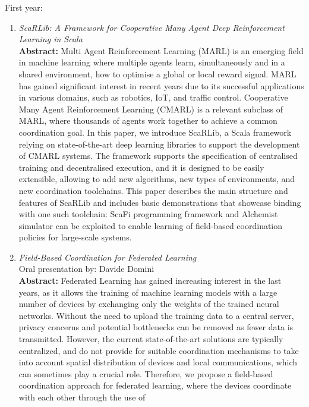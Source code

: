 \documentclass[runningheads]{llncs}
\begin{document}
\noindent
First year:
\begin{enumerate}
    \item \emph{ScaRLib: A Framework for Cooperative Many Agent Deep Reinforcement Learning in Scala}~\cite{DBLP:conf/coordination/DominiCAV23} \\
    \textbf{Abstract: }
    Multi Agent Reinforcement Learning (MARL) is an emerging field in machine learning where multiple agents learn, simultaneously and in a shared environment, 
     how to optimise a global or local reward signal. MARL has gained significant interest in recent years due to its successful applications in various domains,
     such as robotics, IoT, and traffic control. Cooperative Many Agent Reinforcement Learning (CMARL) is a relevant subclass of MARL, where thousands of 
     agents work together to achieve a common coordination goal.
    In this paper, we introduce ScaRLib, a Scala framework relying on state-of-the-art deep learning libraries to support the development of CMARL systems. 
    The framework supports the specification of centralised training and decentralised execution, and it is designed to be easily extensible, allowing to add new 
     algorithms, new types of environments, and new coordination toolchains.
    This paper describes the main structure and features of ScaRLib and includes basic demonstrations that showcase binding with one such toolchain: 
     ScaFi programming framework and Alchemist simulator can be exploited to enable learning of field-based coordination policies for large-scale systems.
    \item \emph{Field-Based Coordination for Federated Learning}~\cite{DBLP:conf/coordination/DominiAEV24} \\ Oral presentation by: Davide Domini \\
    \textbf{Abstract: }
    Federated Learning has gained increasing interest in the last years, as it allows the training of machine learning models with a large number of devices 
     by exchanging only the weights of the trained neural networks. 
    Without the need to upload the training data to a central server, privacy concerns and potential bottlenecks can be removed as fewer data is transmitted. 
    However, the current state-of-the-art solutions are typically centralized, and do not provide for suitable coordination mechanisms to take into account 
     spatial distribution of devices and local communications, which can sometimes play a crucial role. 
    Therefore, we propose a field-based coordination approach for federated learning, where the devices coordinate with each other through the use of 

\end{enumerate}
\end{document}
